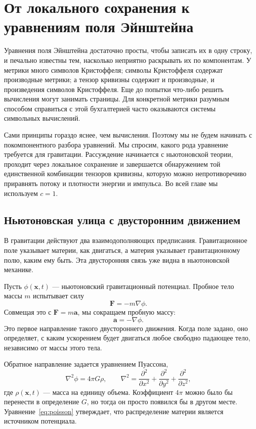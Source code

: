 \chapter{От локального сохранения к уравнениям поля Эйнштейна}

Уравнения поля Эйнштейна достаточно просты, чтобы записать их в одну строку, и печально известны тем, насколько неприятно раскрывать их по компонентам. У метрики много символов Кристоффеля; символы Кристоффеля содержат производные метрики; а тензор кривизны содержит и производные, и произведения символов Кристоффеля. Еще до попытки что-либо решить вычисления могут занимать страницы. Для конкретной метрики разумным способом справиться с этой бухгалтерией часто оказываются системы символьных вычислений.

Сами принципы гораздо яснее, чем вычисления. Поэтому мы не будем начинать с покомпонентного разбора уравнений. Мы спросим, какого рода уравнение требуется для гравитации. Рассуждение начинается с ньютоновской теории, проходит через локальное сохранение и завершается обнаружением той единственной комбинации тензоров кривизны, которую можно непротиворечиво приравнять потоку и плотности энергии и импульса. Во всей главе мы используем \(c=1\).

\section{Ньютоновская улица с двусторонним движением}

В гравитации действуют два взаимодополняющих предписания. Гравитационное поле указывает материи, как двигаться, а материя указывает гравитационному полю, каким ему быть. Эта двусторонняя связь уже видна в ньютоновской механике.

Пусть \(\phi(\mathbf{x},t)\) — ньютоновский гравитационный потенциал. Пробное тело массы \(m\) испытывает силу
\begin{equation}
 \mathbf{F}=-m\nabla\phi.
\end{equation}
Совмещая это с \(\mathbf{F}=m\mathbf{a}\), мы сокращаем пробную массу:
\begin{equation}
 \mathbf{a}=-\nabla\phi.
\end{equation}
Это первое направление такого двустороннего движения. Когда поле задано, оно определяет, с каким ускорением будет двигаться любое свободно падающее тело, независимо от массы этого тела.

Обратное направление задается уравнением Пуассона,
\begin{equation}
 \nabla^2\phi=4\pi G\rho,
 \qquad
 \nabla^2=
 \frac{\partial^2}{\partial x^2}
 +\frac{\partial^2}{\partial y^2}
 +\frac{\partial^2}{\partial z^2},
 \label{eq:poisson}
\end{equation}
где \(\rho(\mathbf{x},t)\) — масса на единицу объема. Коэффициент \(4\pi\) можно было бы перенести в определение \(G\), но тогда он просто появился бы в другом месте. Уравнение~\eqref{eq:poisson} утверждает, что распределение материи является источником потенциала.


